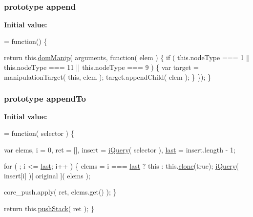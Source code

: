 \hypertarget{jquery-1_810_82-vsdoc_8js_a6b9ad5e0cf5c7480e9a327c771349a90}{
\subsubsection[{append}]{ {\bf prototype} append}}\label{jquery-1_810_82-vsdoc_8js_a6b9ad5e0cf5c7480e9a327c771349a90}
{\bfseries Initial value\-:}
\begin{DoxyCode}
= \textcolor{keyword}{function}() \{


        \textcolor{keywordflow}{return} this.\hyperlink{jquery-1_810_82-vsdoc_8js_a00a63bd312ef048290dc1755ccb8bae4}{domManip}( arguments, \textcolor{keyword}{function}( elem ) \{
            \textcolor{keywordflow}{if} ( this.nodeType === 1 || this.nodeType === 11 || this.nodeType === 9 ) \{
                var target = manipulationTarget( \textcolor{keyword}{this}, elem );
                target.appendChild( elem );
            \}
        \});
    \}
\end{DoxyCode}
\hypertarget{jquery-1_810_82-vsdoc_8js_a74dc247b9c1e66b8cd2aad9037eeaca5}{
\subsubsection[{append\-To}]{ {\bf prototype} append\-To}}\label{jquery-1_810_82-vsdoc_8js_a74dc247b9c1e66b8cd2aad9037eeaca5}
{\bfseries Initial value\-:}
\begin{DoxyCode}
= \textcolor{keyword}{function}( selector ) \{


        var elems,
            i = 0,
            ret = [],
            insert = \hyperlink{jquery-1_810_82-vsdoc_8js_add5237586d970a38a81f990e8eb28c6c}{jQuery}( selector ),
            \hyperlink{jquery-1_810_82-vsdoc_8js_a5a9684d230de11a6ec3029bcce128977}{last} = insert.length - 1;

        \textcolor{keywordflow}{for} ( ; i <= \hyperlink{jquery-1_810_82-vsdoc_8js_a5a9684d230de11a6ec3029bcce128977}{last}; i++ ) \{
            elems = i === \hyperlink{jquery-1_810_82-vsdoc_8js_a5a9684d230de11a6ec3029bcce128977}{last} ? \textcolor{keyword}{this} : this.\hyperlink{jquery-1_810_82-vsdoc_8js_a7d74ce76585989b4b6e2d506577e13ad}{clone}(\textcolor{keyword}{true});
            \hyperlink{jquery-1_810_82-vsdoc_8js_add5237586d970a38a81f990e8eb28c6c}{jQuery}( insert[i] )[ original ]( elems );

            
            core\_push.apply( ret, elems.get() );
        \}

        \textcolor{keywordflow}{return} this.\hyperlink{jquery-1_810_82-vsdoc_8js_afc3a7db1ef2b526338c06c07cecccd44}{pushStack}( ret );
    \}
\end{DoxyCode}
